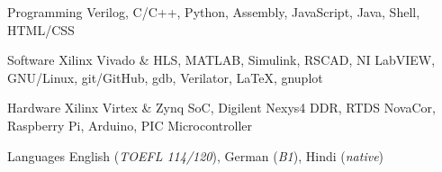 
\begin{cvskills}

\cvskill
	{Programming {\acvHeaderIconSep{}} {}} %
	{Verilog, C/C++, Python, Assembly, JavaScript, Java, Shell, HTML/CSS} %

\cvskill
	{Software {\acvHeaderIconSep{}} {}} %
	{Xilinx Vivado \& HLS, MATLAB, Simulink, RSCAD, NI LabVIEW, GNU/Linux, git/GitHub, gdb, Verilator, \LaTeX, gnuplot} %

\cvskill
	{Hardware {\acvHeaderIconSep{}} {}} %
	{Xilinx Virtex \& Zynq SoC, Digilent Nexys4 DDR, RTDS NovaCor, Raspberry Pi, Arduino, PIC Microcontroller} %

\cvskill
	{Languages {\acvHeaderIconSep{}} {}} %
	{English (\textit{TOEFL 114/120}), German (\textit{B1}), Hindi (\textit{native})} %

\end{cvskills}
